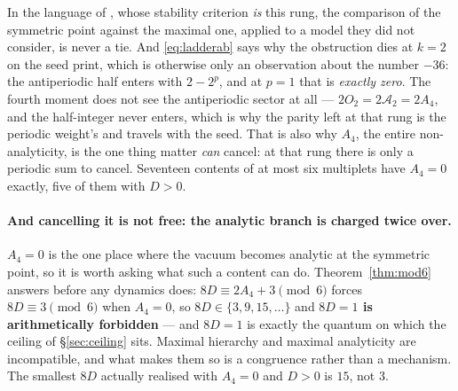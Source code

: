 \documentclass[11pt,a4paper]{article}
\begin{document}
In the language of \cite{CCD24}, whose stability criterion \emph{is} this rung, the comparison of
the symmetric point against the maximal one, applied to a model they did not consider, is never a
tie. And \eqref{eq:ladderab} says why the obstruction dies at $k=2$ on the seed \cite{KM25} print,
which is otherwise only an
observation about the number $-36$: the antiperiodic half enters with $2-2^{p}$, and at $p=1$ that
is \emph{exactly zero}. The fourth moment does not see the antiperiodic sector at all --- $2O_2=2\mathcal{A}_2=2A_4$,
and the half-integer never enters, which is why the parity left at that rung is the periodic
weight's and travels with the seed. That is also why $A_4$, the entire non-analyticity, is the one
thing matter \emph{can} cancel: at that rung there is only a periodic sum to cancel. Seventeen
contents of at most six multiplets have $A_4=0$ exactly, five of them with $D>0$.

\paragraph{And cancelling it is not free: the analytic branch is charged twice over.} $A_4=0$ is
the one place where the vacuum becomes analytic at the symmetric point, so it is worth asking what
such a content can do. Theorem~\ref{thm:mod6} answers before any dynamics does: $8D\equiv 2A_4+3
\pmod 6$ forces $8D\equiv3\pmod6$ when $A_4=0$, so $8D\in\{3,9,15,\dots\}$ and \textbf{$8D=1$ is
arithmetically forbidden} --- and $8D=1$ is exactly the quantum on which the ceiling of
\S\ref{sec:ceiling} sits. Maximal hierarchy and maximal analyticity are incompatible, and what
makes them so is a congruence rather than a mechanism. The smallest $8D$ actually realised with
$A_4=0$ and $D>0$ is $15$, not $3$.
\end{document}
